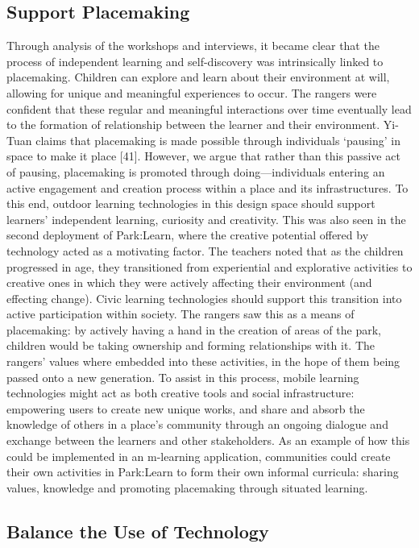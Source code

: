 \subsection{Support Placemaking}

Through analysis of the workshops and interviews, it became clear that the process of independent learning and self-discovery was intrinsically linked to placemaking. Children can explore and learn about their environment at will, allowing for unique and meaningful experiences to occur. The rangers were confident that these regular and meaningful interactions over time eventually lead to the formation of relationship between the learner and their environment. Yi-Tuan claims that placemaking is made possible through individuals ‘pausing’ in space to make it place [41]. However, we argue that rather than this passive act of pausing, placemaking is promoted through doing—individuals entering an active engagement and creation process within a place and its infrastructures. To this end, outdoor learning technologies in this design space should support learners’ independent learning, curiosity and creativity. This was also seen in the second deployment of Park:Learn, where the creative potential offered by technology acted as a motivating factor. 
The teachers noted that as the children progressed in age, they transitioned from experiential and explorative activities to creative ones in which they were actively affecting their environment (and effecting change). Civic learning technologies should support this transition into active participation within society. The rangers saw this as a means of placemaking: by actively having a hand in the creation of areas of the park, children would be taking ownership and forming relationships with it. The rangers’ values where embedded into these activities, in the hope of them being passed onto a new generation. To assist in this process, mobile learning technologies might act as both creative tools and social infrastructure: empowering users to create new unique works, and share and absorb the knowledge of others in a place’s community through an ongoing dialogue and exchange between the learners and other stakeholders. As an example of how this could be implemented in an m-learning application, communities could create their own activities in Park:Learn to form their own informal curricula: sharing values, knowledge and promoting placemaking through situated learning.

\subsection{Balance the Use of Technology}

